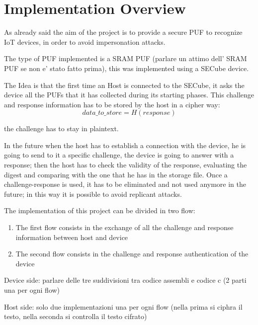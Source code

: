 \chapter{Implementation Overview}
As already said the aim of the project is to provide a secure PUF to recognize IoT devices, in order to avoid impersonation attacks.

The type of PUF implemented is a SRAM PUF (parlare un attimo dell' SRAM PUF se non e' stato fatto prima), this was implemented using a SECube device.

The Idea is that the first time an Host is connected to the SECube, it asks the device all the PUFs that it has collected during its starting phases.
This challenge and response information has to be stored by the host in a cipher way:
\begin{equation}\label{eq:eq1}
 data\_to\_store=H(response)
 \end{equation}
 
  the challenge has to stay in plaintext.

In the future when the host has to establish a connection with the device, he is going to send to it a specific challenge, the device is going to answer with a response;
then the host has to check the validity of the response, evaluating the digest and comparing with the one that he has in the storage file.
Once a challenge-response is used, it has to be eliminated and not used anymore in the future; in this way it is possible to avoid replicant attacks.


The implementation of this project can be divided in two flow:
\begin{enumerate}
	\item The first flow consists in the exchange of all the challenge and response information between host and device
	\item The second flow consists in the challenge and response authentication of the device
\end{enumerate}

Device side: parlare delle tre suddivisioni tra codice assembli e codice c (2 parti una per ogni flow)

Host side: solo due implementazioni una per ogni flow (nella prima si ciphra il testo, nella seconda si controlla il testo cifrato)





